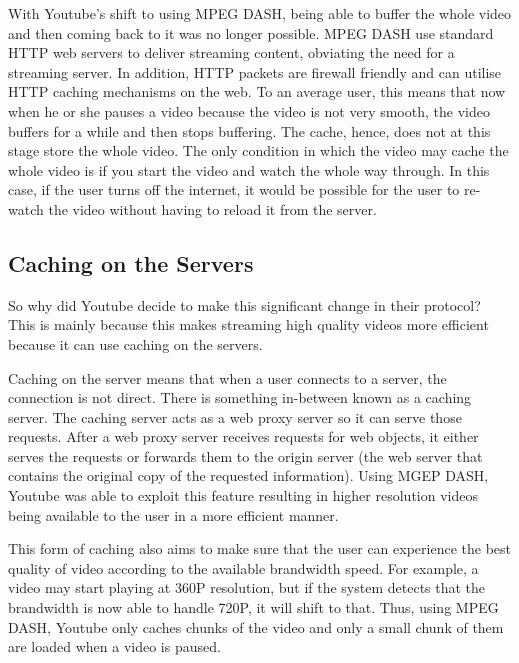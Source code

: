 With Youtube's shift to using MPEG DASH, being able to buffer the whole video and then coming back to it was no longer possible. MPEG DASH use standard HTTP web servers to deliver streaming content, obviating the need for a streaming server. In addition, HTTP packets are firewall friendly and can utilise HTTP caching mechanisms on the web. To an average user, this means that now when he or she pauses a video because the video is not very smooth, the video buffers for a while and then stops buffering. The cache, hence, does not at this stage store the whole video. The only condition in which the video may cache the whole video is if you start the video and watch the whole way through. In this case, if the user turns off the internet, it would be possible for the user to re-watch the video without having to reload it from the server.

\subsection{Caching on the Servers}
So why did Youtube decide to make this significant change in their protocol? This is mainly because this makes streaming high quality videos more efficient because it can use caching on the servers.

Caching on the server means that when a user connects to a server, the connection is not direct. There is something in-between known as a caching server. The caching server acts as a web proxy server so it can serve those requests. After a web proxy server receives requests for web objects, it either serves the requests or forwards them to the origin server (the web server that contains the original copy of the requested information). Using MGEP DASH, Youtube was able to exploit this feature resulting in higher resolution videos being available to the user in a more efficient manner.

This form of caching also aims to make sure that the user can experience the best quality of video according to the available brandwidth speed. For example, a video may start playing at 360P resolution, but if the system detects that the brandwidth is now able to handle 720P, it will shift to that. Thus, using MPEG DASH, Youtube only caches chunks of the video and only a small chunk of them are loaded when a video is paused. 
